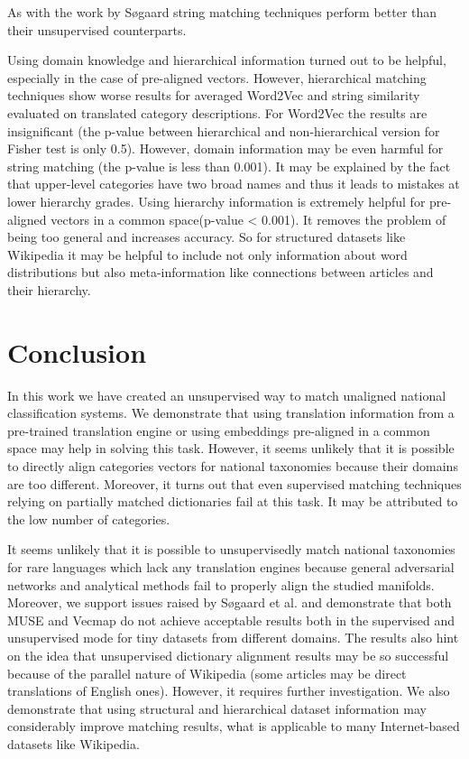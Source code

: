 \documentclass[conference]{IEEEtran}
\begin{document}
As with the work by Søgaard string matching techniques perform better than their unsupervised counterparts.

Using domain knowledge and hierarchical information turned out to be helpful, especially in the case of pre-aligned vectors. However, hierarchical matching techniques show worse results for averaged Word2Vec and string similarity evaluated on translated category descriptions. For Word2Vec the results are insignificant (the p-value between hierarchical and non-hierarchical version for Fisher test is only 0.5). However, domain information may be even harmful for string matching (the p-value is less than 0.001). It may be explained by the fact that upper-level categories have two broad names and thus it leads to mistakes at lower hierarchy grades. Using hierarchy information is extremely helpful for pre-aligned vectors in a common space(p-value < 0.001). It removes the problem of being too general and increases accuracy. So for structured datasets like Wikipedia it may be helpful to include not only information about word distributions but also meta-information like connections between articles and their hierarchy.

\section{Conclusion}
In this work we have created an unsupervised way to match unaligned national classification systems. We demonstrate that using translation information from a pre-trained translation engine or using embeddings pre-aligned in a common space may help in solving this task. However, it seems unlikely that it is possible to directly align categories vectors for national taxonomies because their domains are too different. Moreover, it turns out that even supervised matching techniques relying on partially matched dictionaries fail at this task. It may be attributed to the low number of categories.

It seems unlikely that it is possible to unsupervisedly match national taxonomies for rare languages which lack any translation engines because general adversarial networks and analytical methods fail to properly align the studied manifolds. Moreover, we support issues raised by Søgaard et al. \cite{ruder-muse-limitations} and demonstrate that both MUSE and Vecmap do not achieve acceptable results both in the supervised and unsupervised mode for tiny datasets from different domains.
The results also hint on the idea that unsupervised dictionary alignment results may be so successful because of the parallel nature of Wikipedia (some articles may be direct translations of English ones). However, it requires further investigation.
We also demonstrate that using structural and hierarchical dataset information may considerably improve matching results, what is applicable to many Internet-based datasets like Wikipedia.
%
%
\printbibliography
\end{document}
